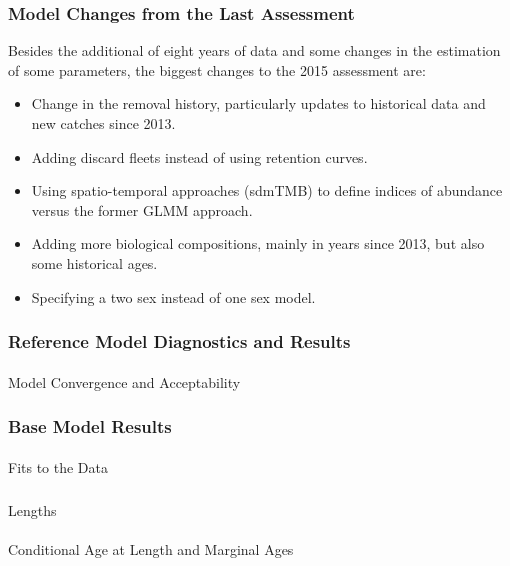 \documentclass[
]{scrartcl}
\makeatletter
\let\oldparagraph\paragraph
\renewcommand{\paragraph}{
    \@ifstar
      \xxxParagraphStar
      \xxxParagraphNoStar
  }
\newcommand{\xxxParagraphStar}[1]{\oldparagraph*{#1}\mbox{}}
\newcommand{\xxxParagraphNoStar}[1]{\oldparagraph{#1}\mbox{}}
\let\oldsubparagraph\subparagraph
\renewcommand{\subparagraph}{
    \@ifstar
      \xxxSubParagraphStar
      \xxxSubParagraphNoStar
  }
\newcommand{\xxxSubParagraphStar}[1]{\oldsubparagraph*{#1}\mbox{}}
\newcommand{\xxxSubParagraphNoStar}[1]{\oldsubparagraph{#1}\mbox{}}
\providecommand{\tightlist}{%
  \setlength{\itemsep}{0pt}\setlength{\parskip}{0pt}}\usepackage{longtable,booktabs,array}
\makeatother
\begin{document}
\subsubsection{Model Changes from the Last
Assessment}\label{model-changes-from-the-last-assessment}

Besides the additional of eight years of data and some changes in the
estimation of some parameters, the biggest changes to the 2015
assessment are:

\begin{itemize}
\tightlist
\item
  Change in the removal history, particularly updates to historical data
  and new catches since 2013.
\item
  Adding discard fleets instead of using retention curves.
\item
  Using spatio-temporal approaches (sdmTMB) to define indices of
  abundance versus the former GLMM approach.
\item
  Adding more biological compositions, mainly in years since 2013, but
  also some historical ages.
\item
  Specifying a two sex instead of one sex model.
\end{itemize}

\newpage{}

\subsubsection{Reference Model Diagnostics and
Results}\label{reference-model-diagnostics-and-results}

\paragraph{Model Convergence and Acceptability}\label{model-convergence}

\subsubsection{Base Model Results}\label{base-model-results}

\paragraph{Fits to the Data}\label{fits-to-the-data}

\subparagraph{Lengths}\label{lengths}

\paragraph{Conditional Age at Length and Marginal
Ages}\label{conditional-age-at-length-and-marginal-ages}
\end{document}

